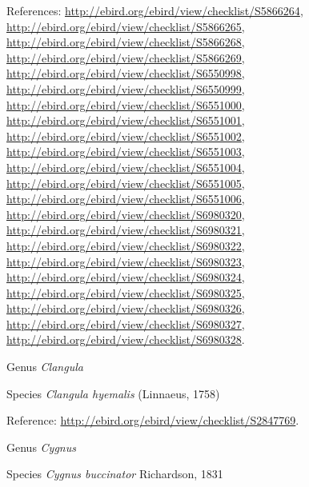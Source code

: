 \documentclass[9pt, article]{memoir}
\begin{document}
\begin{multicols}{2}
\vspace{6pt}References: 
\url{http://ebird.org/ebird/view/checklist/S5866264}, 
\url{http://ebird.org/ebird/view/checklist/S5866265}, 
\url{http://ebird.org/ebird/view/checklist/S5866268}, 
\url{http://ebird.org/ebird/view/checklist/S5866269}, 
\url{http://ebird.org/ebird/view/checklist/S6550998}, 
\url{http://ebird.org/ebird/view/checklist/S6550999}, 
\url{http://ebird.org/ebird/view/checklist/S6551000}, 
\url{http://ebird.org/ebird/view/checklist/S6551001}, 
\url{http://ebird.org/ebird/view/checklist/S6551002}, 
\url{http://ebird.org/ebird/view/checklist/S6551003}, 
\url{http://ebird.org/ebird/view/checklist/S6551004}, 
\url{http://ebird.org/ebird/view/checklist/S6551005}, 
\url{http://ebird.org/ebird/view/checklist/S6551006}, 
\url{http://ebird.org/ebird/view/checklist/S6980320}, 
\url{http://ebird.org/ebird/view/checklist/S6980321}, 
\url{http://ebird.org/ebird/view/checklist/S6980322}, 
\url{http://ebird.org/ebird/view/checklist/S6980323}, 
\url{http://ebird.org/ebird/view/checklist/S6980324}, 
\url{http://ebird.org/ebird/view/checklist/S6980325}, 
\url{http://ebird.org/ebird/view/checklist/S6980326}, 
\url{http://ebird.org/ebird/view/checklist/S6980327}, 
\url{http://ebird.org/ebird/view/checklist/S6980328}.

\vspace{6pt}\noindent\hspace{30pt}Genus \textit{Clangula}


\vspace{6pt}\noindent\hspace{36pt}Species \textit{Clangula hyemalis} (Linnaeus, 1758)


\vspace{6pt}Reference: 
\url{http://ebird.org/ebird/view/checklist/S2847769}.

\vspace{6pt}\noindent\hspace{30pt}Genus \textit{Cygnus}


\vspace{6pt}\noindent\hspace{36pt}Species \textit{Cygnus buccinator} Richardson, 1831



\end{multicols}
\end{document}
